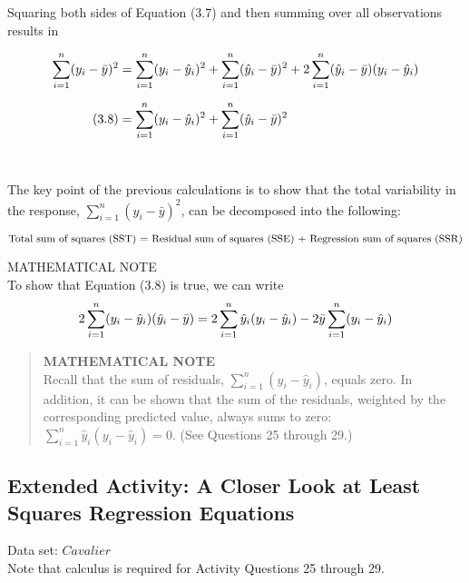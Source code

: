 \documentclass[
]{report}
\begin{document}
Squaring both sides of Equation (3.7) and then summing over all observations results in

\begin{align}
\sum_{i=1}^n (y_i - \bar{y})^2 \notag
  &= \sum_{i=1}^n (y_i - \hat{y}_i)^2
  + \sum_{i=1}^n (\hat{y}_i - \bar{y})^2
  + 2 \sum_{i=1}^n (\hat{y}_i - \bar{y})(y_i - \hat{y}_i) \\[6pt] \tag{3.8}
  &= \sum_{i=1}^n (y_i - \hat{y}_i)^2 + \sum_{i=1}^n (\hat{y}_i - \bar{y})^2 \\[6pt] \notag
\end{align}

The key point of the previous calculations is to show that the total variability in the response, \(\sum_{i=1}^n (y_i - \bar{y})^2\), can be decomposed into the following:

\begin{equation}
\text{Total sum of squares (SST) = Residual sum of squares (SSE) + Regression sum of squares (SSR)} \notag
\end{equation}

MATHEMATICAL NOTE\\
To show that Equation (3.8) is true, we can write
\begin{equation}
2 \sum_{i=1}^n (y_i - \hat{y}_i)(\hat{y}_i - \bar{y})
  = 2 \sum_{i=1}^n \hat{y}_i (y_i - \hat{y}_i)
  - 2 \bar{y} \sum_{i=1}^n (y_i - \hat{y}_i) \notag
\end{equation}

\begin{quote}
\textbf{MATHEMATICAL NOTE}\\
Recall that the sum of residuals, \(\sum_{i=1}^n (y_i - \hat{y}_i)\), equals zero. In addition, it can be shown that the sum of the residuals, weighted by the corresponding predicted value, always sums to zero: \(\sum_{i=1}^n \hat{y}_i (y_i - \hat{y}_i) = 0.\) (See Questions 25 through 29.)
\end{quote}

\subsection*{Extended Activity: A Closer Look at Least Squares Regression Equations}\label{extended-activity-a-closer-look-at-least-squares-regression-equations}

Data set: \(Cavalier\)\\
Note that calculus is required for Activity Questions 25 through 29.
\end{document}
